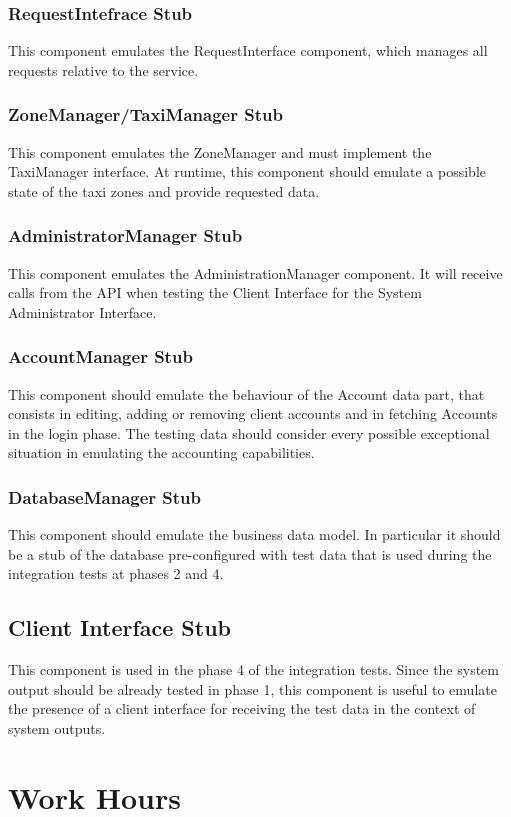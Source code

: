\documentclass[11pt, a4paper,titlepage]{article}
\begin{document}
			\subsubsection{RequestIntefrace Stub}
			This component emulates the RequestInterface component, which manages all requests relative to the service. 
			\subsubsection{ZoneManager/TaxiManager Stub}
			This component emulates the ZoneManager and must implement the TaxiManager interface. At runtime, this component should emulate a possible state of the taxi zones and provide requested data. 
			\subsubsection{AdministratorManager Stub}
			This component emulates the AdministrationManager component. It will receive calls from the API when testing the Client Interface for the System Administrator Interface. 
			\subsubsection{AccountManager Stub}
			This component should emulate the behaviour of the Account data part, that consists in editing, adding or removing client accounts and in fetching Accounts in the login phase. The testing data should consider every possible exceptional situation in emulating the accounting capabilities.
			\subsubsection{DatabaseManager Stub}
			This component should emulate the business data model. In particular it should be a stub of the database pre-configured with test data that is used during the integration tests at phases 2 and 4.
			\subsection{Client Interface Stub}
			This component is used in the phase 4 of the integration tests. Since the system output should be already tested in phase 1, this component is useful to emulate the presence of a client interface for receiving the test data in the context of system outputs.
	\section{Work Hours}
	
\end{document}
